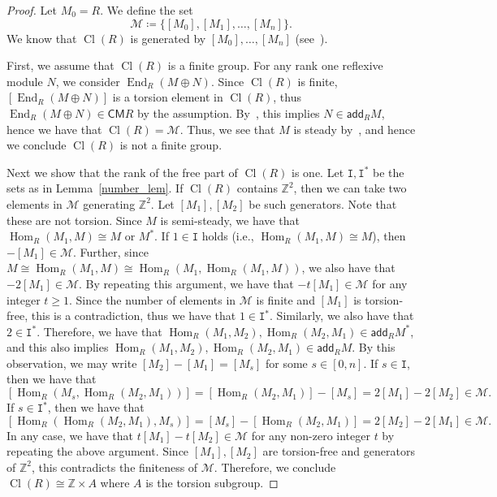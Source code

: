 \documentclass[11pt]{amsart}
\theoremstyle{definition}
\newcommand{\calM}{\mathcal{M}}
\newcommand{\ZZ}{\mathbb{Z}}
\newcommand{\ttI}{\mathtt{I}}
\DeclareMathOperator{\Hom}{Hom}
\DeclareMathOperator{\Cl}{Cl}
\DeclareMathOperator{\End}{End}
\newcommand{\add}{\mathsf{add}}
\newcommand{\CM}{\mathsf{CM}}
\newcommand*{\MK}{\mkern 2mu}
\begin{document}
\begin{proof}
Let $M_0=R$. We define the set
\[
\calM\coloneqq\{  [M_0], [M_1],\dots, [M_n] \}.
\]
We know that $\Cl(R)$ is generated by $[M_0],\dots,[M_n]$ (see~\cite[Proposition~2.8$\MK$(a)]{IN}).

First, we assume that $\Cl(R)$ is a finite group. For any rank one reflexive module $N$, we consider $\End_R(M\oplus N)$. Since $\Cl(R)$ is finite, $[\End_R(M\oplus N)]$ is a torsion element in $\Cl(R)$, thus $\End_R(M\oplus N)\in\CM R$ by the assumption. By~\cite[Proposition~4.5]{IW2}, this implies $N\in\add_RM$, hence we have that $\Cl(R)=\calM$. Thus, we see that $M$ is steady by~\cite[Theorem~3.1]{IN}, and hence we conclude $\Cl(R)$ is not a finite group.

Next we show that the rank of the free part of $\Cl(R)$ is one. Let $\ttI, \ttI^*$ be the sets as in Lemma~\ref{number_lem}. If $\Cl(R)$ contains $\ZZ^2$, then we can take two elements in $\calM$ generating $\ZZ^2$. Let $[M_1], [M_2]$ be such generators. Note that these are not torsion. Since $M$ is semi-steady, we have that $\Hom_R(M_1,M)\cong M$ or $M^*$. If $1\in\ttI$ holds (i.e., $\Hom_R(M_1,M)\cong M$), then $-[M_1]\in\calM$. Further, since $M\cong\Hom_R(M_1,M)\cong\Hom_R(M_1,\Hom_R(M_1,M))$, we also have that $-2[M_1]\in\calM$. By repeating this argument, we have that $-t[M_1]\in\calM$ for any integer $t\ge 1$. Since the number of elements in $\calM$ is finite and $[M_1]$ is torsion-free, this is a contradiction, thus we have that $1\in\ttI^*$. Similarly, we also have that $2\in\ttI^*$. Therefore, we have that $\Hom_R(M_1,M_2), \Hom_R(M_2,M_1)\in\add_RM^*$, and this also implies $\Hom_R(M_1,M_2), \Hom_R(M_2,M_1)\in\add_RM$. By this observation, we may write $[M_2]-[M_1]=[M_s]$ for some $s\in[0,n]$. If $s\in\ttI$, then we have that
\[
[\Hom_R(M_s,\Hom_R(M_2,M_1))]=[\Hom_R(M_2,M_1)]-[M_s]=2[M_1]-2[M_2]\in\calM.
\]
If $s\in\ttI^*$, then we have that
\[
[\Hom_R(\Hom_R(M_2,M_1),M_s)]=[M_s]-[\Hom_R(M_2,M_1)]=2[M_2]-2[M_1]\in\calM.
\]
In any case, we have that $t[M_1]-t[M_2]\in\calM$ for any non-zero integer $t$ by repeating the above argument. Since $[M_1], [M_2]$ are torsion-free and generators of $\ZZ^2$, this contradicts the finiteness of $\calM$. Therefore, we conclude $\Cl(R)\cong\ZZ\times A$ where $A$ is the torsion subgroup.


\end{proof}
\end{document}
